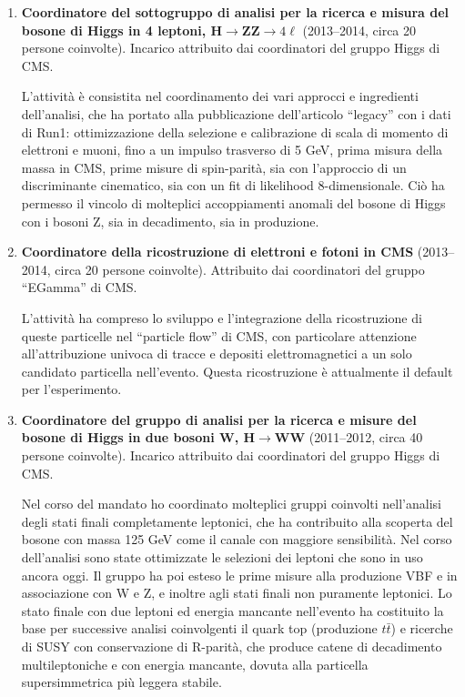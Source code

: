 \documentclass[11pt,twoside,a4paper]{article}
\begin{document}
\begin{enumerate}
\item \textbf{Coordinatore del sottogruppo di analisi per la ricerca e
  misura del bosone di Higgs in 4 leptoni, H$\to$ZZ$\to4\ell$}
  (2013--2014, circa 20 persone coinvolte). Incarico attribuito dai
  coordinatori del gruppo Higgs di CMS.

  L'attivit\`a \`e consistita nel coordinamento dei vari approcci e
  ingredienti dell'analisi, che ha portato alla pubblicazione
  dell'articolo ``legacy'' con i dati di Run1: ottimizzazione della
  selezione e calibrazione di scala di momento di elettroni e muoni,
  fino a un impulso trasverso di 5 GeV, prima misura della massa in
  CMS, prime misure di spin-parit\`a, sia con l'approccio di un
  discriminante cinematico, sia con un fit di likelihood
  8-dimensionale. Ci\`o ha permesso il vincolo di molteplici
  accoppiamenti anomali del bosone di Higgs con i bosoni Z, sia in
  decadimento, sia in produzione.

\item \textbf{Coordinatore della ricostruzione di elettroni e fotoni in CMS}
  (2013--2014, circa 20 persone coinvolte). Attribuito dai
  coordinatori del gruppo ``EGamma'' di CMS.
  
  L'attivit\`a ha compreso lo sviluppo e l'integrazione della
  ricostruzione di queste particelle nel ``particle flow'' di CMS, con
  particolare attenzione all'attribuzione univoca di tracce e depositi
  elettromagnetici a un solo candidato particella nell'evento. Questa
  ricostruzione \`e attualmente il default per l'esperimento.
  
\item \textbf{Coordinatore del gruppo di analisi per la ricerca e misure
  del bosone di Higgs in due bosoni W, H$\to$WW}
  (2011--2012, circa 40 persone coinvolte). Incarico attribuito
  dai coordinatori del gruppo Higgs di CMS.
  
  Nel corso del mandato ho coordinato molteplici gruppi coinvolti
  nell'analisi degli stati finali completamente leptonici, che ha
  contribuito alla scoperta del bosone con massa 125 GeV come il
  canale con maggiore sensibilit\`a. Nel corso dell'analisi sono
  state ottimizzate le selezioni dei leptoni che sono in uso ancora
  oggi. Il gruppo ha poi esteso le prime misure alla produzione VBF
  e in associazione con W e Z, e inoltre agli stati finali non
  puramente leptonici. Lo stato finale con due leptoni ed energia
  mancante nell'evento ha costituito la base per successive analisi
  coinvolgenti il quark top (produzione $t\bar t$) e ricerche di
  SUSY con conservazione di R-parit\`a, che produce catene di
  decadimento multileptoniche e con energia mancante, dovuta alla
  particella supersimmetrica pi\`u leggera stabile.


\end{enumerate}
\end{document}
